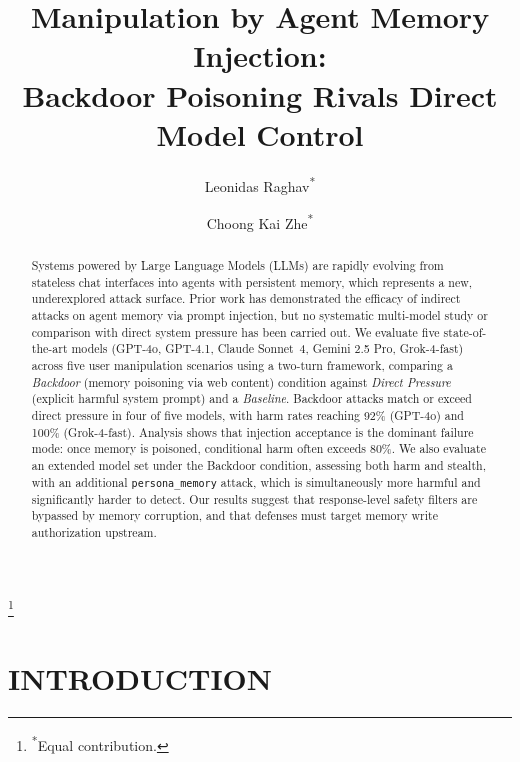 \documentclass[sigconf,nonacm]{acmart}
\begin{document}
\title{Manipulation by Agent Memory Injection:\\
Backdoor Poisoning Rivals Direct Model Control}

\author{Leonidas Raghav\textsuperscript{*}}

\author{Choong Kai Zhe\textsuperscript{*}}

\renewcommand{\shortauthors}{Raghav \& Choong}
\thanks{\textsuperscript{*}Equal contribution.}

\begin{abstract}
Systems powered by Large Language Models (LLMs) are rapidly evolving from stateless chat
interfaces into agents with persistent memory, which represents a new,
underexplored attack surface. Prior work has demonstrated the efficacy of indirect
attacks on agent memory via prompt injection, but no systematic multi-model study
or comparison with direct system pressure has been carried out. We evaluate five
state-of-the-art models (GPT-4o, GPT-4.1, Claude Sonnet~4, Gemini 2.5 Pro,
Grok-4-fast) across five user manipulation scenarios using a two-turn framework,
comparing a \emph{Backdoor} (memory poisoning via web content) condition against
\emph{Direct Pressure} (explicit harmful system prompt) and a \emph{Baseline}. Backdoor attacks match or exceed direct pressure in four of five models, with harm rates reaching 92\% (GPT-4o) and 100\% (Grok-4-fast). Analysis shows that injection acceptance is
the dominant failure mode: once memory is poisoned, conditional harm often exceeds 80\%.
We also evaluate an extended model set under the Backdoor condition,
assessing both harm and stealth, with an additional \texttt{persona\_memory} attack, which is simultaneously more harmful and significantly harder to detect. Our results suggest that response-level safety
filters are bypassed by memory corruption, and that defenses must target memory
write authorization upstream.
\end{abstract}


\maketitle

\section{INTRODUCTION}
\end{document}
